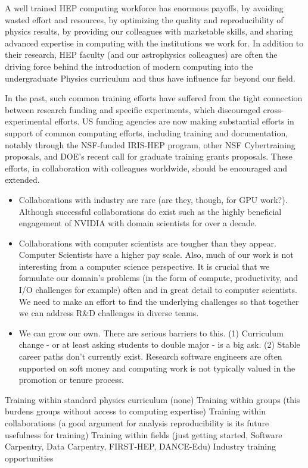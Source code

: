 A well trained HEP computing workforce has enormous payoffs, by avoiding wasted effort and resources, by optimizing the quality and reproducibility of physics results, by providing our colleagues with marketable skills, and sharing advanced expertise in computing with the institutions we work for.  In addition to their research, HEP faculty (and our astrophysics colleagues)  are often the driving force behind the introduction of  modern computing into the undergraduate Physics curriculum and thus have influence far beyond our field.  

In the past, such common training efforts have suffered from the  tight connection between research funding and specific experiments, which discouraged cross-experimental efforts. US funding agencies are now making substantial efforts in support of common computing efforts, including training and documentation, notably through the NSF-funded IRIS-HEP program, other NSF Cybertraining proposals, and DOE's recent call for graduate training grants proposals. These efforts, in collaboration with colleagues worldwide, should be encouraged and extended.

\begin{itemize}
\item Collaborations with industry are rare (are they, though, for GPU work?).  Although successful collaborations do exist such as the highly beneficial engagement of NVIDIA with domain scientists for over a decade. 
\item Collaborations with computer scientists are tougher than they appear.  Computer Scientists have a higher pay scale.  Also, much of our work is not interesting from a computer science perspective. It is crucial that we formulate our domain's problems (in the form of compute, productivity, and I/O challenges for example) often and in great detail to computer scientists. We need to make an effort to find the underlying challenges so that together we can address R\&D challenges in diverse teams. 
\item We can grow our own.  There are serious barriers to this.  (1) Curriculum change - or at least asking students to double major - is a big ask.  (2) Stable career paths don't currently exist.  Research software engineers are often supported on soft money and computing work is not typically valued in the promotion or tenure process.
\end{itemize}

Training within standard physics curriculum (none)
Training within groups (this burdens groups without access to computing expertise)
Training within collaborations (a good argument for analysis reproducibility is its future usefulness for training)
Training within fields (just getting started, Software Carpentry, Data Carpentry, FIRST-HEP, DANCE-Edu)
Industry training opportunities

